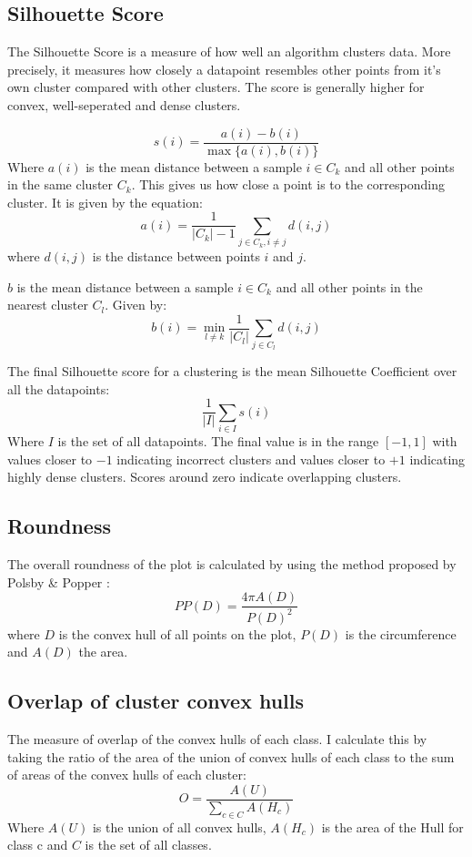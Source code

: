 \documentclass[a4paper, 12pt, twoside]{report}
\begin{document}
\subsection{Silhouette Score}
\label{sec:org8d91088}
The Silhouette Score is a measure of how well an algorithm clusters data. More precisely, it measures how closely a datapoint resembles other points from it's own cluster compared with other clusters. The score is generally higher for convex, well-seperated and dense clusters.

\[s(i) = \frac{a(i) - b(i)}{\max\{a(i), b(i)\}} \]
Where $a(i)$ is the mean distance between a sample \(i \in C_{k}\) and all other points in the same cluster \(C_{k}\). This gives us how close a point is to the corresponding cluster. It is given by the equation:
\[ a(i) = \frac{1}{|C_{k}| - 1} \sum_{j \in C_{k}, i \neq j}{d(i,j)}\]
where \(d(i,j)\) is the distance between points \(i\) and \(j\).

\(b\) is the mean distance between a sample \(i \in C_{k}\) and all other points in the nearest cluster \(C_{l}\). Given by:
\[ b(i) = \min_{l \neq k}{\frac{1}{|C_{l}|} \sum_{j \in C_{l}}{d(i,j)}} \]

The final Silhouette score for a clustering is the mean Silhouette Coefficient over all the datapoints:
\[ \frac{1}{|I|}\sum_{i \in I}{s(i)} \]
Where \(I\) is the set of all datapoints. The final value is in the range \([-1, 1]\) with values closer to $-1$ indicating incorrect clusters and values closer to $+1$ indicating highly dense clusters. Scores around zero indicate overlapping clusters.

\subsection{Roundness}
\label{sec:org7b61201}

The overall roundness of the plot is calculated by using the method proposed by Polsby \& Popper \cite{popper}:
\[PP(D) = \frac{4 \pi A(D)}{P(D)^{2}} \]
where \(D\) is the convex hull of all points on the plot, \(P(D)\) is the circumference and \(A(D)\) the area.
\subsection{Overlap of cluster convex hulls}
\label{sec:org274a5d2}

The measure of overlap of the convex hulls of each class. I calculate this by taking the ratio of the area of the union of convex hulls of each class to the sum of areas of the convex hulls of each cluster:
\[ O = \frac{A(U)}{\sum_{c \in C}A(H_{c})} \]
Where \(A(U)\) is the union of all convex hulls, \(A(H_{c})\) is the area of the Hull for class c and \(C\) is the set of all classes.
\end{document}
